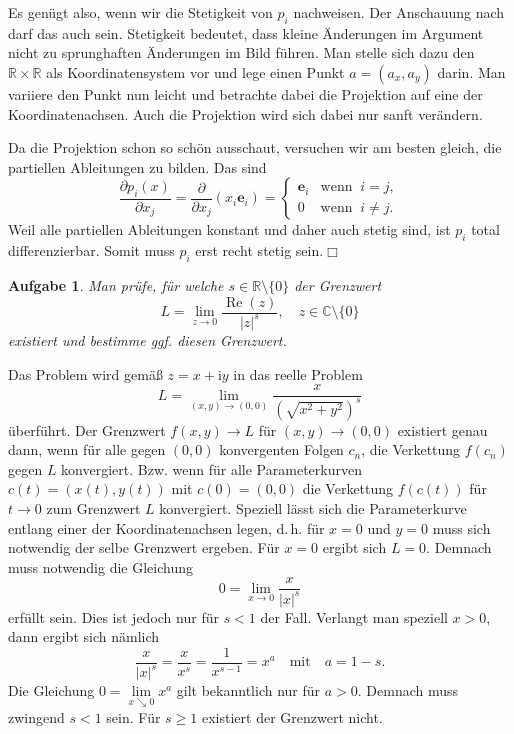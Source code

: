 \documentclass[a4paper,10pt,fleqn,twoside]{scrartcl}
\numberwithin{equation}{section}
\newcommand{\R}{\mathbb R}
\newcommand{\C}{\mathbb C}
\newcommand{\ui}{\mathrm i}
\newcommand{\real}{\operatorname{Re}}
\newcommand{\strong}[1]{{\normalfont\sffamily\bfseries #1}}
\theoremstyle{Aufgabe}
\newtheorem{Aufgabe}{\sffamily Aufgabe}[section]
\begin{document}
Es genügt also, wenn wir die Stetigkeit von $p_i$ nachweisen.
Der Anschauung nach darf das auch sein. Stetigkeit bedeutet, dass
kleine Änderungen im Argument nicht zu sprunghaften Änderungen im
Bild führen. Man stelle sich dazu den $\R\times\R$ als
Koordinatensystem vor und lege einen Punkt $a=(a_x,a_y)$ darin.
Man variiere den Punkt nun leicht und betrachte dabei die Projektion
auf eine der Koordinatenachsen. Auch die Projektion wird sich dabei
nur sanft verändern.

Da die Projektion schon so schön ausschaut, versuchen wir am besten
gleich, die partiellen Ableitungen zu bilden. Das sind
\begin{equation}
\frac{\partial p_i(x)}{\partial x_j}
= \frac{\partial}{\partial x_j}(x_i\mathbf e_i) =
\begin{cases}
\mathbf e_i &\text{wenn}\;\; i=j,\\
0 &\text{wenn}\;\; i\ne j.
\end{cases}
\end{equation}
Weil alle partiellen Ableitungen konstant und daher auch stetig
sind, ist $p_i$ total differenzierbar. Somit muss $p_i$ erst
recht stetig sein.\;$\Box$

\begin{Aufgabe}
Man prüfe, für welche $s\in\R\setminus\{0\}$ der Grenzwert
\[L = \lim_{z\to 0} \frac{\real(z)}{|z|^s},\quad z\in\C\setminus\{0\}\]
existiert und bestimme ggf. diesen Grenzwert.
\end{Aufgabe}
\noindent\strong{Lösung.} Das Problem wird gemäß $z=x+\ui y$ in das reelle
Problem
\begin{equation}
L = \lim_{(x,y)\to (0,0)} \frac{x}{(\sqrt{x^2+y^2})^s}
\end{equation}
überführt. Der Grenzwert $f(x,y)\to L$ für $(x,y)\to (0,0)$ existiert
genau dann, wenn für alle gegen $(0,0)$ konvergenten Folgen $c_n$, die
Verkettung $f(c_n)$ gegen $L$ konvergiert. Bzw. wenn für alle
Parameterkurven $c(t)=(x(t),y(t))$ mit $c(0)=(0,0)$ die Verkettung
$f(c(t))$ für $t\to 0$ zum Grenzwert $L$ konvergiert. Speziell lässt
sich die Parameterkurve entlang einer der Koordinatenachsen legen,
d.\,h. für $x=0$ und $y=0$ muss sich notwendig der selbe Grenzwert
ergeben. Für $x=0$ ergibt
sich $L=0$. Demnach muss notwendig die Gleichung%
\begin{equation}
0 = \lim_{x\to 0} \frac{x}{|x|^s}
\end{equation}
erfüllt sein. Dies ist jedoch nur für $s<1$ der Fall. Verlangt man
speziell $x>0$, dann ergibt sich nämlich%
\begin{equation}
\frac{x}{|x|^s} = \frac{x}{x^s} = \frac{1}{x^{s-1}}
= x^a\quad\text{mit}\quad a=1-s.
\end{equation}
Die Gleichung $0=\lim\limits_{x\searrow 0} x^a$ gilt bekanntlich nur für
$a>0$. Demnach muss zwingend $s<1$ sein. Für $s\ge 1$ existiert der
Grenzwert nicht.
\end{document}
